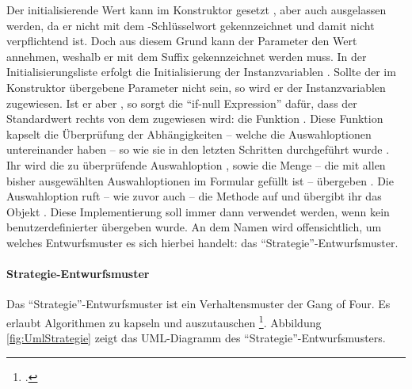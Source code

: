 Der initialisierende Wert kann im Konstruktor gesetzt ,
aber auch ausgelassen werden,
da er nicht mit dem -Schlüsselwort gekennzeichnet und damit nicht verpflichtend ist.
Doch aus diesem Grund kann der Parameter den Wert  annehmen,
weshalb er mit dem Suffix  gekennzeichnet werden muss.
In der Initialisierungsliste erfolgt die Initialisierung der Instanzvariablen  .
Sollte der im Konstruktor übergebene Parameter nicht  sein,
so wird er der Instanzvariablen zugewiesen.
Ist er aber ,
so sorgt die \enquote{if-null Expression} dafür,
dass der Standardwert rechts von dem  zugewiesen wird:
die Funktion  .
Diese Funktion kapselt die Überprüfung der Abhängigkeiten
-- welche die Auswahloptionen  untereinander haben --
so wie sie in den letzten Schritten durchgeführt wurde .
Ihr wird die zu überprüfende Auswahloption ,
sowie die Menge  -- die mit allen bisher ausgewählten Auswahloptionen im Formular gefüllt ist --
übergeben .
Die Auswahloption  ruft
-- wie zuvor auch --
die Methode  auf
und übergibt ihr das Objekt  .
Diese Implementierung soll immer dann verwendet werden, 
wenn kein benutzerdefinierter  übergeben wurde.
An dem Namen  wird offensichtlich, um welches Entwurfsmuster es sich hierbei handelt: das \enquote{Strategie}-Entwurfsmuster. 


\paragraph{Strategie-Entwurfsmuster} Das \enquote{Strategie}-Entwurfsmuster ist ein Verhaltensmuster der Gang of Four.
Es erlaubt Algorithmen zu kapseln und auszutauschen \footcite[Vgl.][S. 373]{gamma2009entwurfsmuster}.
Abbildung \ref{fig:UmlStrategie} zeigt das UML-Diagramm des \enquote{Strategie}-Entwurfsmusters. 

